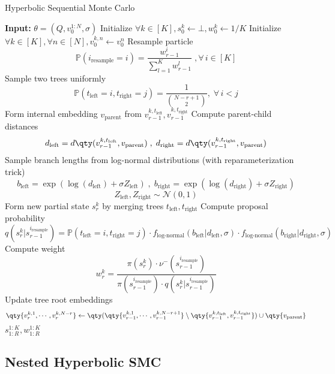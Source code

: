 \documentclass{article}
\begin{document}
\begin{algorithm}
  \caption{Hyperbolic Sequential Monte Carlo}
  \label{alg:hyperbolic-smc}
  \begin{algorithmic}[1]
    \State \textbf{Input:} $\theta = (Q, v_0^{1:N}, \sigma)$
    \State Initialize $\forall k \in [K], s_0^k \leftarrow \bot, w_0^k \leftarrow 1/K$
    \State Initialize $\forall k \in [K], \forall n \in [N], v_0^{k,n} \leftarrow v_0^n$
    \State Resample particle
    \[
      \mathbb{P}(i_\text{resample} = i) = \frac{w_{r-1}^i}{\sum_{l=1}^K w_{r-1}^l} \; , \forall \, i \in [K]
    \]
    \State Sample two trees uniformly
    \[
      \mathbb{P}(t_\text{left} = i, t_\text{right} = j) = \frac{1}{\binom{N-r+1}{2}} , \; \forall \, i < j
    \]
    \State Form internal embedding $v_\text{parent}$ from $v_{r-1}^{k,t_\text{left}}, v_{r-1}^{k,t_\text{right}}$
    \State Compute parent-child distances
    \[
      d_\text{left} = d\qty(v_{r-1}^{k,t_\text{left}}, v_\text{parent}) \;,\; d_\text{right} = d\qty(v_{r-1}^{k,t_\text{right}}, v_\text{parent})
    \]
    \State Sample branch lengths from log-normal distributions (with reparameterization trick)
    \[
      b_\text{left} = \exp(\log(d_\text{left}) + \sigma Z_\text{left}) \;,\; b_\text{right} = \exp(\log(d_\text{right}) + \sigma Z_\text{right})
    \]
    \[
      Z_\text{left}, Z_\text{right} \sim \mathcal{N}(0, 1)
    \]
    \State Form new partial state $s_r^k$ by merging trees $t_\text{left}, t_\text{right}$
    \State Compute proposal probability
    \[
      q(s_r^k | s_{r-1}^{i_\text{resample}}) = \mathbb{P}(t_\text{left} = i, t_\text{right} = j) \cdot f_\text{log-normal}(b_\text{left} | d_\text{left}, \sigma) \cdot f_\text{log-normal}(b_\text{right} | d_\text{right}, \sigma)
    \]
    \State Compute weight
    \[
      w_r^k = \frac{\pi(s_r^k) \cdot \nu^-(s_{r-1}^{i_\text{resample}})}{\pi(s_{r-1}^{i_\text{resample}}) \cdot  q(s_r^k | s_{r-1}^{i_\text{resample}})}
    \]
    \State
    Update tree root embeddings
    \[
      \qty{v_r^{k,1}, \cdots, v_r^{k,N-r}} \leftarrow \qty(\qty{v_{r-1}^{k,1}, \cdots, v_{r-1}^{k,N-r+1}} \setminus \qty{v_{r-1}^{k,t_\text{left}}, v_{r-1}^{k,t_\text{right}}}) \cup \qty{v_\text{parent}}
    \]
    \EndFor
    \EndFor
    \State \Return $s_{1:R}^{1:K}, w_{1:R}^{1:K}$
  \end{algorithmic}
\end{algorithm}


\subsection{Nested Hyperbolic SMC}
\end{document}
